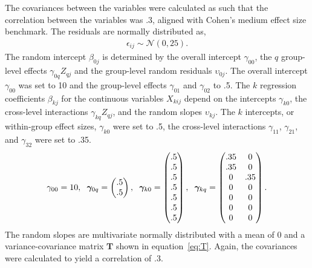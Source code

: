 \documentclass[10pt, a4paper, titlepage]{article}
\begin{document}
The covariances between the variables were calculated as such that the correlation between the variables was .3, aligned with Cohen's \citeyearpar{cohen1990} medium effect size benchmark. The residuals are normally distributed as,
\begin{align}
    \epsilon_{ij} \sim \mathcal{N}(0, 25).
\end{align}
The random intercept $\beta_{0j}$ is determined by the overall intercept $\gamma_{00}$, the $q$ group-level effects $\gamma_{0q}Z_{qj}$ and the group-level random residuals $\upsilon_{0j}$. The overall intercept $\gamma_{00}$ was set to 10 and the group-level effects $\gamma_{01}$ and $\gamma_{02}$ to .5.
The $k$ regression coefficients $\beta_{kj}$ for the continuous variables $X_{kij}$ depend on the intercepts $\gamma_{k0}$, the cross-level interactions $\gamma_{kq}Z_{qj}$, and the random slopes $\upsilon_{kj}$. The $k$ intercepts, or within-group effect sizes, $\gamma_{k0}$ were set to .5, the cross-level interactions $\gamma_{11}$, $\gamma_{21}$, and $\gamma_{32}$ were set to .35.
\begin{align}
    \gamma_{00} = 10, \hspace{.2cm} \boldsymbol{\gamma}_{0q} = \begin{pmatrix}
        .5 \\ .5
        \end{pmatrix}, \hspace{.2cm} \boldsymbol{\gamma}_{k0} = \begin{pmatrix}
        .5 \\ .5 \\ .5 \\ .5 \\ .5 \\ .5 \\ .5
        \end{pmatrix}, \hspace{.2cm} \boldsymbol{\gamma}_{kq} = \begin{pmatrix}
        .35 & 0 \\ .35 & 0 \\ 0 & .35 \\ 0 & 0 \\ 0 & 0 \\ 0 & 0 \\ 0 & 0
        \end{pmatrix}.
\end{align}
The random slopes are multivariate normally distributed with a mean of 0 and a variance-covariance matrix $\mathbf{T}$ shown in equation~\ref{eq:T}. Again, the covariances were calculated to yield a correlation of .3.
\end{document}
